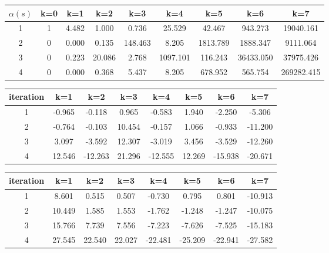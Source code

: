 \documentclass{article}
\begin{document}
\begin{table}
	\begin{tabular}{|c|c|c|c|c|c|c|c|c|}
		\hline
		$\alpha(s)$ & k=0 & k=1 & k=2 & k=3 & k=4 & k=5 & k=6 & k=7 \\
		\hline
		1 & 1 & 4.482 & 1.000 & 0.736 & 25.529 & 42.467 & 943.273 & 19040.161 \\
		\hline
		2 & 0 & 0.000 & 0.135 & 148.463 & 8.205 & 1813.789 & 1888.347 &  9111.064\\
		\hline
		3 & 0 & 0.223 & 20.086 & 2.768 & 1097.101 & 116.243 &  36433.050 & 37975.426 \\
		\hline
		4 & 0 & 0.000 & 0.368 & 5.437 & 8.205 & 678.952 & 565.754 & 269282.415 \\
		\hline
	\end{tabular}
\end{table}

\begin{table}
	\begin{tabular}{|c|c|c|c|c|c|c|c|}
		\hline
		iteration & k=1 & k=2 & k=3 & k=4 & k=5 & k=6 & k=7 \\
		\hline
		1 &  -0.965 & -0.118 & 0.965 & -0.583 & 1.940 & -2.250 & -5.306 \\
		\hline
		2 & -0.764 & -0.103 & 10.454 & -0.157 & 1.066 & -0.933 & -11.200 \\
		\hline
		3 & 3.097 & -3.592 & 12.307 & -3.019 & 3.456 & -3.529 & -12.260 \\
		\hline
		4 & 12.546 & -12.263 & 21.296 & -12.555 & 12.269 & -15.938 & -20.671 \\
		\hline
	\end{tabular}
\end{table}

\begin{table}
	\begin{tabular}{|c|c|c|c|c|c|c|c|}
		\hline
		iteration & k=1 & k=2 & k=3 & k=4 & k=5 & k=6 & k=7 \\
		\hline
		1 & 8.601 & 0.515 & 0.507 & -0.730 & 0.795 & 0.801 & -10.913 \\
		\hline
		2 & 10.449 & 1.585 & 1.553 & -1.762 & -1.248 & -1.247 & -10.075 \\
		\hline
		3 & 15.766 & 7.739 & 7.556 & -7.223 & -7.626 & -7.525 & -15.183 \\
		\hline
		4 & 27.545 & 22.540 & 22.027 & -22.481 & -25.209 & -22.941 & -27.582 \\
		\hline
	\end{tabular}
\end{table}
\end{document}
